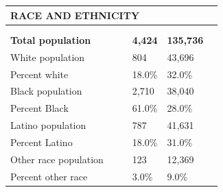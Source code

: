 \documentclass[9pt]{report}
\begin{document}
\vspace{12pt}
\setlength{\tabcolsep}{.01in} %
\begin{tabular}{p{.10in}p{.10in}p{.10in}p{3.7in}>{\hfill}p{.85in}>{\hfill}p{.85in}>{\hfill}p{.85in}>{\hfill}p{.85in}p{0.1in}}
\multicolumn{9}{l}{\parbox{7.1in}{\raggedright{\large{\strut\textbf{RACE AND ETHNICITY}\strut}}}} \\ 
\hline
\multicolumn{4}{l}{\parbox{3.5in}{\raggedright{\textbf{}}}} & \multicolumn{1}{r}{\parbox{.85in}{\strut\raggedleft{\textbf{}\strut}}} & \multicolumn{1}{r}{\parbox{.85in}{\strut\raggedleft{\textbf{}\strut}}} & \multicolumn{1}{r}{\parbox{.85in}{\strut{}}} & \multicolumn{1}{r}{\parbox{.85in}{\strut{}}} & \\ 
\multicolumn{9}{l}{} \\ 
\multicolumn{4}{l}{\parbox{3.5in}{\strut\raggedright{\textbf{Total population}\strut}}} & \textbf{} & \textbf{} & \textbf{4,424} & \textbf{135,736} & \textbf{} \\ 
\multicolumn{4}{l}{\parbox{3.6in}{\strut\raggedright{{White population}}\strut}} &  &  & 804 & 43,696 & \multicolumn{1}{l}{}  \\ 
\multicolumn{4}{l}{\parbox{3.6in}{\strut\raggedright{{Percent white}}\strut}} &  &  & 18.0\% & 32.0\% & \multicolumn{1}{l}{}  \\ 
\multicolumn{4}{l}{\parbox{3.6in}{\strut\raggedright{{Black population}}\strut}} &  &  & 2,710 & 38,040 & \multicolumn{1}{l}{}  \\ 
\multicolumn{4}{l}{\parbox{3.6in}{\strut\raggedright{{Percent Black}}\strut}} &  &  & 61.0\% & 28.0\% & \multicolumn{1}{l}{}  \\ 
\multicolumn{4}{l}{\parbox{3.6in}{\strut\raggedright{{Latino population}}\strut}} &  &  & 787 & 41,631 & \multicolumn{1}{l}{}  \\ 
\multicolumn{4}{l}{\parbox{3.6in}{\strut\raggedright{{Percent Latino}}\strut}} &  &  & 18.0\% & 31.0\% & \multicolumn{1}{l}{}  \\ 
\multicolumn{4}{l}{\parbox{3.6in}{\strut\raggedright{{Other race population}}\strut}} &  &  & 123 & 12,369 & \multicolumn{1}{l}{}  \\ 
\multicolumn{4}{l}{\parbox{3.6in}{\strut\raggedright{{Percent other race}}\strut}} &  &  & 3.0\% & 9.0\% & \multicolumn{1}{l}{}  \\ 

\end{tabular}
\setlength{\tabcolsep}{6pt} %
\end{document}
